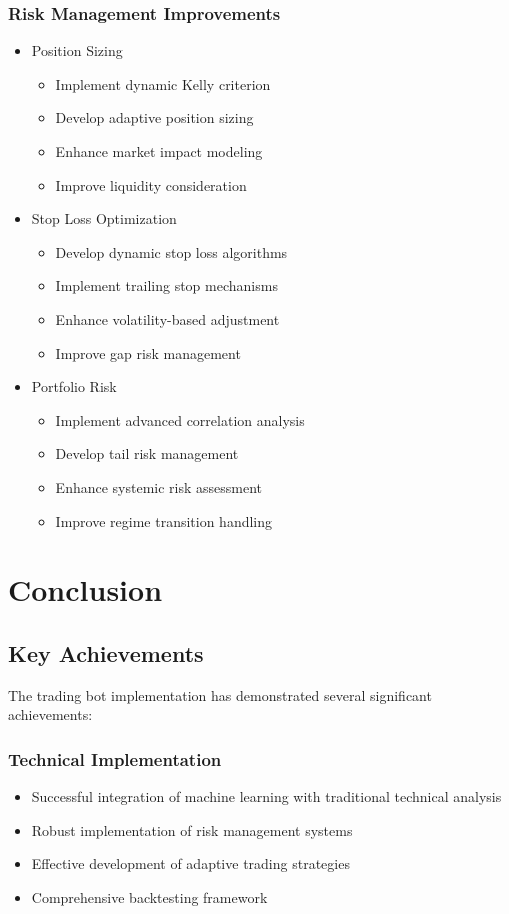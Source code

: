 \documentclass[conference]{IEEEtran}
\begin{document}
\subsubsection{Risk Management Improvements}
\begin{itemize}
    \item Position Sizing
    \begin{itemize}
        \item Implement dynamic Kelly criterion
        \item Develop adaptive position sizing
        \item Enhance market impact modeling
        \item Improve liquidity consideration
    \end{itemize}
    
    \item Stop Loss Optimization
    \begin{itemize}
        \item Develop dynamic stop loss algorithms
        \item Implement trailing stop mechanisms
        \item Enhance volatility-based adjustment
        \item Improve gap risk management
    \end{itemize}
    
    \item Portfolio Risk
    \begin{itemize}
        \item Implement advanced correlation analysis
        \item Develop tail risk management
        \item Enhance systemic risk assessment
        \item Improve regime transition handling
    \end{itemize}
\end{itemize}

\section{Conclusion}
\subsection{Key Achievements}
The trading bot implementation has demonstrated several significant achievements:

\subsubsection{Technical Implementation}
\begin{itemize}
    \item Successful integration of machine learning with traditional technical analysis
    \item Robust implementation of risk management systems
    \item Effective development of adaptive trading strategies
    \item Comprehensive backtesting framework
\end{itemize}
\end{document}
